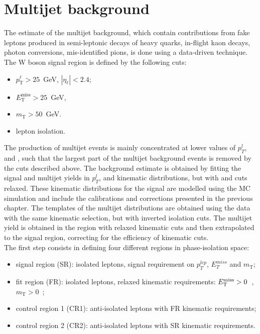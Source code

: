     \section{Multijet background}
 The estimate of the multijet background, which contain contributions from fake leptons produced in semi-leptonic decays of heavy quarks, in-flight kaon decays, photon conversions, mis-identified pions, is done using a data-driven technique. The W boson signal region is defined by the following cuts:
\begin{itemize}
	\item $p_\text{T}^\ell>25$~GeV, $|\eta_\ell|<2.4$;
	\item $E_\text{T}^\text{miss}>25$~GeV,
	\item $m_\text{T}>50$~GeV.
	\item lepton isolation.
\end{itemize}

The production of multijet events is mainly concentrated at lower values of $p_T^l$, \met and \mt, such that the largest part of the multijet background events is removed by the cuts described above. The background estimate is obtained by fitting the signal and multijet yields in $p_T^l$, \met and \mt kinematic distributions, but with \met and \mt cuts relaxed. These kinematic distributions for the signal are modelled using the MC simulation and include the calibrations and corrections presented in the previous chapter. The templates of the multijet distributions are obtained using the data with the same kinematic selection, but with inverted isolation cuts. The multijet yield is obtained in the region with relaxed kinematic cuts and then extrapolated to the signal region, correcting for the efficiency of kinematic cuts.\\
The first step consists in defining four different regions in phase-isolation space:
\begin{itemize}
	\item signal region (SR): isolated leptons, signal requirement on $p_{T}^{lep}$, $E_T^{miss}$ and $m_\text{T}$;
	\item fit region (FR): isolated leptons, relaxed kinematic requirements: $E_{\text{T}}^{\text{miss}}>0$~\gev, $m_\text{T}>0$~\gev;
	\item control region 1 (CR1): anti-isolated leptons with FR kinematic requirements;
	\item control region 2 (CR2): anti-isolated leptons with SR kinematic requirements.
\end{itemize}


